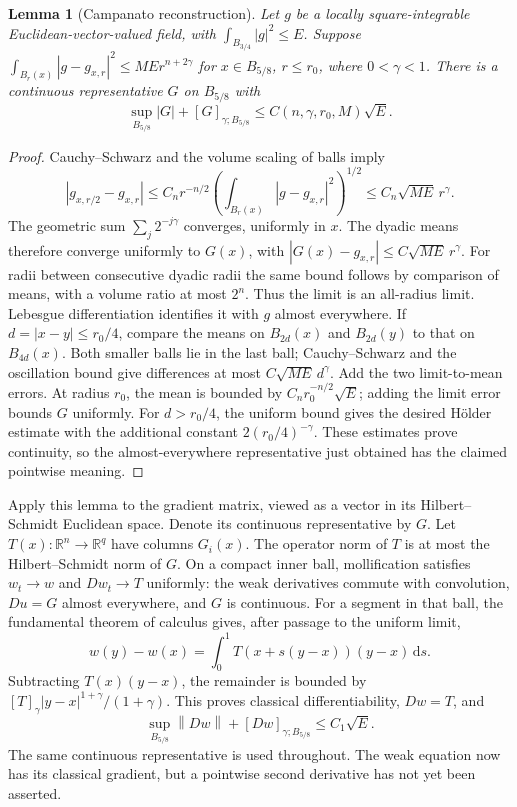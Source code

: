 \documentclass[11pt,a4paper]{article}
\numberwithin{equation}{section}
\newtheorem{lemma}[theorem]{Lemma}
\theoremstyle{definition}
\theoremstyle{remark}
\newcommand{\R}{\mathbb R}
\newcommand{\dd}{\,\mathrm d}
\newcommand{\norm}[1]{\left\lVert#1\right\rVert}
\begin{document}
\begin{lemma}[Campanato reconstruction]
\label{lem:campanato}
Let \(g\) be a locally square-integrable Euclidean-vector-valued field,
with \(\int_{B_{3/4}}|g|^2\le E\). Suppose
\(\int_{B_r(x)}|g-g_{x,r}|^2\le M E r^{n+2\gamma}\) for
\(x\in B_{5/8}\), \(r\le r_0\), where \(0<\gamma<1\).
There is a continuous representative \(G\) on \(B_{5/8}\) with
\begin{equation}\label{eq:campanatobound}
 \sup_{B_{5/8}}|G|+[G]_{\gamma;B_{5/8}}
 \le C(n,\gamma,r_0,M)\sqrt E.
\end{equation}
\end{lemma}
\begin{proof}
Cauchy--Schwarz and the volume scaling of balls imply
\[
 |g_{x,r/2}-g_{x,r}|
 \le C_n r^{-n/2}
 \left(\int_{B_r(x)}|g-g_{x,r}|^2\right)^{1/2}
 \le C_n\sqrt{ME}\,r^\gamma.
\]
The geometric sum \(\sum_j2^{-j\gamma}\) converges, uniformly in \(x\).
The dyadic means therefore converge uniformly to \(G(x)\), with
\(|G(x)-g_{x,r}|\le C\sqrt{ME}\,r^\gamma\).
For radii between consecutive dyadic radii the same bound follows by
comparison of means, with a volume ratio at most \(2^n\). Thus the limit
is an all-radius limit. Lebesgue differentiation identifies it with \(g\)
almost everywhere.
If \(d=|x-y|\le r_0/4\), compare the means on \(B_{2d}(x)\) and
\(B_{2d}(y)\) to that on \(B_{4d}(x)\). Both smaller balls lie in the
last ball; Cauchy--Schwarz and the oscillation bound give differences
at most \(C\sqrt{ME}\,d^\gamma\). Add the two limit-to-mean errors.
At radius \(r_0\), the mean is bounded by
\(C_nr_0^{-n/2}\sqrt E\); adding the limit error bounds \(G\) uniformly.
For \(d>r_0/4\), the uniform bound gives the desired H\"older estimate
with the additional constant \(2(r_0/4)^{-\gamma}\). These estimates prove
continuity, so the almost-everywhere representative just obtained has the
claimed pointwise meaning.
\end{proof}

Apply this lemma to the gradient matrix, viewed as a vector in its
Hilbert--Schmidt Euclidean space. Denote its continuous representative
by \(G\). Let \(T(x):\R^n\to\R^q\) have columns \(G_i(x)\).
The operator norm of \(T\) is at most the Hilbert--Schmidt norm of \(G\).
On a compact inner ball, mollification satisfies
\(w_t\to w\) and \(Dw_t\to T\) uniformly: the weak derivatives commute
with convolution, \(Du=G\) almost everywhere, and \(G\) is continuous.
For a segment in that ball, the fundamental theorem of calculus gives,
after passage to the uniform limit,
\begin{equation}\label{eq:segment}
 w(y)-w(x)=\int_0^1 T(x+s(y-x))(y-x)\dd s.
\end{equation}
Subtracting \(T(x)(y-x)\), the remainder is bounded by
\([T]_\gamma |y-x|^{1+\gamma}/(1+\gamma)\). This proves classical
differentiability, \(Dw=T\), and
\begin{equation}\label{eq:c1}
 \sup_{B_{5/8}}\norm{Dw}+[Dw]_{\gamma;B_{5/8}}
 \le C_1\sqrt E.
\end{equation}
The same continuous representative is used throughout. The weak equation
now has its classical gradient, but a pointwise second derivative has not
yet been asserted.
\end{document}
